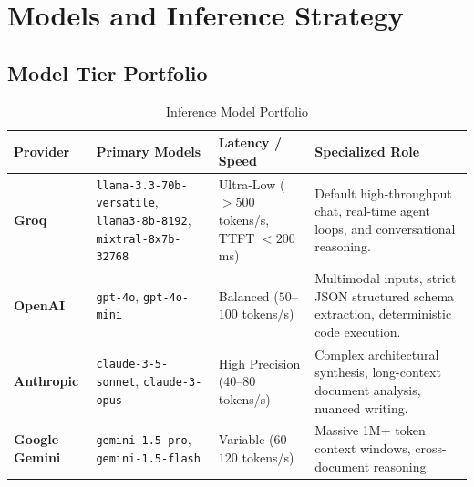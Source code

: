 \documentclass[10pt,a4paper]{article}
\begin{document}
\section{Models and Inference Strategy}

\subsection{Model Tier Portfolio}

\begin{table}[h!]
\centering
\small
\begin{tabularx}{\linewidth}{p{2.8cm}p{3.2cm}p{2.6cm}X}
\toprule
\textbf{Provider} & \textbf{Primary Models} & \textbf{Latency / Speed} & \textbf{Specialized Role} \\
\midrule
\textbf{Groq} & \texttt{llama-3.3-70b-versatile}, \texttt{llama3-8b-8192}, \texttt{mixtral-8x7b-32768} & Ultra-Low ($>500$ tokens/s, TTFT $<200$ms) & Default high-throughput chat, real-time agent loops, and conversational reasoning. \\
\addlinespace
\textbf{OpenAI} & \texttt{gpt-4o}, \texttt{gpt-4o-mini} & Balanced ($50$--$100$ tokens/s) & Multimodal inputs, strict JSON structured schema extraction, deterministic code execution. \\
\addlinespace
\textbf{Anthropic} & \texttt{claude-3-5-sonnet}, \texttt{claude-3-opus} & High Precision ($40$--$80$ tokens/s) & Complex architectural synthesis, long-context document analysis, nuanced writing. \\
\addlinespace
\textbf{Google Gemini} & \texttt{gemini-1.5-pro}, \texttt{gemini-1.5-flash} & Variable ($60$--$120$ tokens/s) & Massive 1M+ token context windows, cross-document reasoning. \\
\bottomrule
\end{tabularx}
\caption{Inference Model Portfolio}
\end{table}
\end{document}
